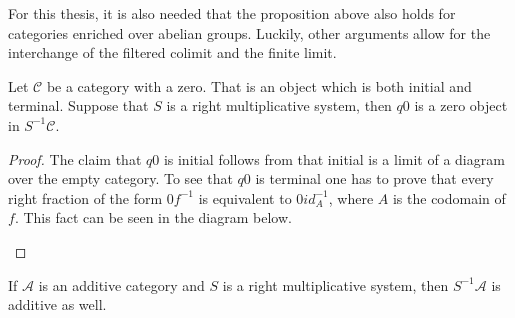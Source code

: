     \begin{remark}
        For this thesis, it is also needed that the proposition above also holds for categories enriched over abelian groups. Luckily, other arguments allow for the interchange of the filtered colimit and the finite limit.
    \end{remark}

    \begin{prop}
        Let $\mathcal{C}$ be a category with a zero. That is an object which is both initial and terminal. Suppose that $S$ is a right multiplicative system, then $q0$ is a zero object in $S^{-1}\mathcal{C}$.
    \end{prop}

    \begin{proof}
        The claim that $q0$ is initial follows from that initial is a limit of a diagram over the empty category. To see that $q0$ is terminal one has to prove that every right fraction of the form $0f^{-1}$ is equivalent to $0id_A^{-1}$, where $A$ is the codomain of $f$. This fact can be seen in the diagram below.
        \begin{center}
        \end{center}
    \end{proof}

    \begin{prop}
        If $\mathcal{A}$ is an additive category and $S$ is a right multiplicative system, then $S^{-1}\mathcal{A}$ is additive as well.
    \end{prop}

